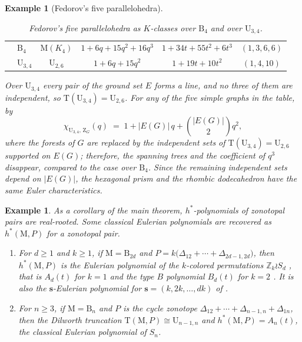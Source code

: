 \documentclass[11pt,a4paper,reqno]{amsart}
\theoremstyle{results}
\theoremstyle{definitions}
\newtheorem{example}[thm]{Example}
\def\Z{\mathbb{Z}}
\def\Z{\mathbb{Z}}
\newcommand{\abs}[1]{\left\lvert#1\right\rvert}
\newcommand{\B}{\textrm{B}}
\newcommand{\M}{\mathrm{M}}
\newcommand{\hstar}{h^{*}}
\newcommand{\DT}{\mathrm{T}}      %
\newcommand{\U}{\mathrm{U}}
\newcommand{\Zg}{\mathrm{Z}}
\begin{document}
\begin{example}[Fedorov's five parallelohedra]
\begin{table}[H]
\begin{tabular}{llcccc}
    & $\B_4$     & $\M(K_4)$  & $1+6q+15q^2+16q^3$ & $1+34t+55t^2+6t^3$ & $(1,3,6,6)$ \\
    & $\U_{3,4}$ & $\U_{2,6}$ & $1+6q+15q^2$       & $1+19t+10t^2$      & $(1,4,10)$ \\
    \hline
  \end{tabular}
  \caption{Fedorov's five parallelohedra as $K$-classes over $\B_4$ and over $\U_{3,4}$.}
  \label{tab:parallelohedra}
\end{table}
Over $\U_{3,4}$ every pair of the ground set $E$ forms a line, and no three of them are independent, so $\DT(\U_{3,4}) = \U_{2,6}$. 
For any of the five simple graphs in the table, by 
\[
  \chi_{\U_{3,4},\, \Zg_G}(q) \;=\; 1 + \abs{E(G)}\, q + \binom{\abs{E(G)}}{2} q^2,
\]
where the forests of $G$ are replaced by the independent sets of $\DT(\U_{3, 4}) = \U_{2,6}$
supported on $E(G)$; therefore, the spanning trees and the coefficient of $q^3$ disappear, compared to the case over $\B_4$.
Since the remaining independent sets depend on $\abs{E(G)}$, the hexagonal prism and
the rhombic dodecahedron have the same Euler characteristics.
\end{example}

\begin{example}\label{ex:specializations}
As a corollary of the main theorem, $\hstar$-polynomials of zonotopal pairs are real-rooted.
Some classical Eulerian polynomials are recovered as $h^{\ast}(\M, P)$ for a zonotopal pair.
  \begin{enumerate}[leftmargin=20pt]
    \item For $d\geqslant1$ and $k\geqslant1$, if $\M = \B_{2d}$ and $P = k\big(\Delta_{12} + \cdots + \Delta_{2d-1,2d}\big)$,
      then $\hstar(\M,P)$ is the Eulerian polynomial of the
      $k$-colored permutations $\Z_k \wr S_d$
      \cite{steingrmsson1992permutation}, that is $A_d(t)$ for $k = 1$ and the
      type $B$ polynomial $B_d(t)$ for $k = 2$ \cite[Theorem 3.4]{brenti1994q}.
      It is also the $\mathbf{s}$-Eulerian polynomial for
      $\mathbf s = (k, 2k, \dots, dk)$ of \cite[Corollary 3.6]{savage2015s}.

    \item For $n\geqslant3$, if $\M = \B_n$ and $P$ is the cycle zonotope $\Delta_{12} + \cdots + \Delta_{n-1,n} + \Delta_{1n}$,
      then the Dilworth truncation $\DT(\M,P) \cong \U_{n-1,n}$ and
      $\hstar(\M,P) = A_n(t)$, the classical Eulerian polynomial of $S_n$.
  \end{enumerate}
\end{example}
\end{document}
